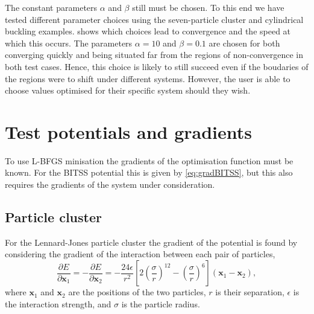 \documentclass[aps,physrev,10pt]{revtex4-2}
\begin{document}
The constant parameters $\alpha$ and $\beta$ still must be chosen.
To this end we have tested different parameter choices using the seven-particle cluster and cylindrical buckling examples.
 shows which choices lead to convergence and the speed at which this occurs.
The parameters $\alpha = 10$ and $\beta = 0.1$ are chosen for both converging quickly and being situated far from the regions of non-convergence in both test cases.
Hence, this choice is likely to still succeed even if the boudaries of the regions were to shift under different systems.
However, the user is able to choose values optimised for their specific system should they wish.


\section{Test potentials and gradients}
To use L-BFGS minisation the gradients of the optimisation function must be known.
For the BITSS potential this is given by \cref{eq:gradBITSS}, but this also requires the gradients of the system under consideration.

\subsection{Particle cluster}
For the Lennard-Jones particle cluster the gradient of the potential is found by considering the gradient of the interaction between each pair of particles,
\begin{equation}
  \frac{\partial E}{\partial \bm{x}_1} = -\frac{\partial E}{\partial \bm{x}_2} = - \frac{24 \epsilon}{r^2}
    \left[ 2 \left(\frac{\sigma}{r}\right)^{12} - \left(\frac{\sigma}{r}\right)^6 \right] (\bm{x}_1 - \bm{x}_2),
\end{equation}
where $\bm{x}_1$ and $\bm{x}_2$ are the positions of the two particles, $r$ is their separation, $\epsilon$ is the interaction strength, and $\sigma$ is the particle radius.
\end{document}
